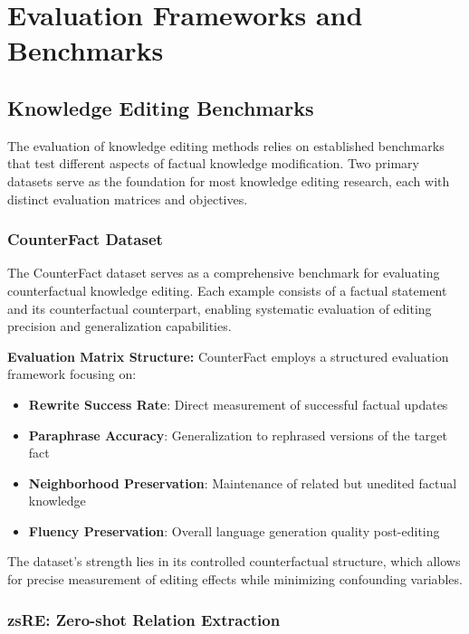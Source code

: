 \section{Evaluation Frameworks and Benchmarks}

\subsection{Knowledge Editing Benchmarks}

The evaluation of knowledge editing methods relies on established benchmarks that test different aspects of factual knowledge modification. Two primary datasets serve as the foundation for most knowledge editing research, each with distinct evaluation matrices and objectives.

\subsubsection{CounterFact Dataset}

The CounterFact dataset serves as a comprehensive benchmark for evaluating counterfactual knowledge editing. Each example consists of a factual statement and its counterfactual counterpart, enabling systematic evaluation of editing precision and generalization capabilities.

\textbf{Evaluation Matrix Structure:}
CounterFact employs a structured evaluation framework focusing on:
\begin{itemize}
    \item \textbf{Rewrite Success Rate}: Direct measurement of successful factual updates
    \item \textbf{Paraphrase Accuracy}: Generalization to rephrased versions of the target fact
    \item \textbf{Neighborhood Preservation}: Maintenance of related but unedited factual knowledge
    \item \textbf{Fluency Preservation}: Overall language generation quality post-editing
\end{itemize}

The dataset's strength lies in its controlled counterfactual structure, which allows for precise measurement of editing effects while minimizing confounding variables.

\subsubsection{zsRE: Zero-shot Relation Extraction}

